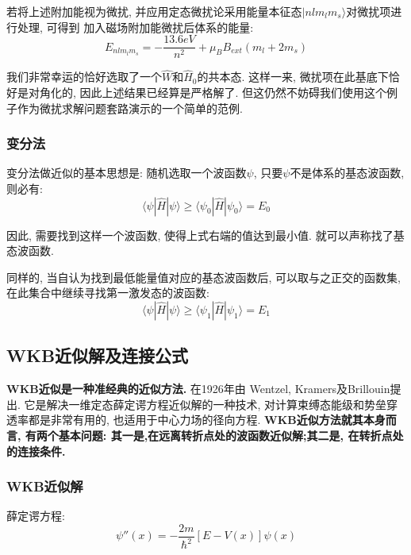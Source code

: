 \documentclass[a4paper, 11pt]{article}
\begin{document}
\begin{spacing}{1.2}
          若将上述附加能视为微扰, 并应用定态微扰论采用能量本征态$|nlm_lm_s\rangle$对微扰项进行处理, 可得到
          加入磁场附加能微扰后体系的能量:
          \begin{equation}
            E_{nlm_lm_s} = -\dfrac{13.6eV}{n^2} + \mu_BB_{ext}(m_l+2m_s)
          \end{equation}

          我们非常幸运的恰好选取了一个$\hat{W}$和$\hat{H}_0$的共本态. 这样一来, 微扰项在此基底下恰好是对角化的, 
          因此上述结果已经算是严格解了. 但这仍然不妨碍我们使用这个例子作为微扰求解问题套路演示的一个简单的范例. 
        
        \subsubsection{变分法}
          变分法做近似的基本思想是: 随机选取一个波函数$\psi$, 只要$\psi$不是体系的基态波函数, 则必有:
          \begin{equation}
            \langle\psi|\hat{H}|\psi\rangle \geq \langle\psi_0|\hat{H}|\psi_0\rangle = E_0  
          \end{equation}

          因此, 需要找到这样一个波函数, 使得上式右端的值达到最小值. 就可以声称找了基态波函数. 

          同样的, 当自认为找到最低能量值对应的基态波函数后, 可以取与之正交的函数集, 在此集合中继续寻找第一激发态的波函数:
          \begin{equation}
            \langle\psi|\hat{H}|\psi\rangle \geq \langle\psi_1|\hat{H}|\psi_1\rangle = E_1  
          \end{equation}

      \subsection{WKB近似解及连接公式}

        \textbf{WKB近似是一种准经典的近似方法. }在1926年由 Wentzel, Kramers及Brillouin提出.
        它是解决一维定态薛定谔方程近似解的一种技术, 对计算束缚态能级和势垒穿透率都是非常有用的, 也适用于中心力场的径向方程.
        \textbf{WKB近似方法就其本身而言, 有两个基本问题: 其一是,在远离转折点处的波函数近似解;其二是, 在转折点处的连接条件.}

        \subsubsection{WKB近似解}
          薛定谔方程:
          \begin{equation}
            \psi''(x) = -\dfrac{2m}{\hbar^2}\left[E-V(x)\right]\psi(x)
          \end{equation}


\end{spacing}
\end{document}
